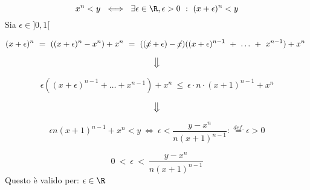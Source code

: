 \documentclass[../rip.tex]{subfiles}
\begin{document}
\begin{dimo}[$x^n < y$]

	\begin{equation}
	x^n < y \ \iff\ \exists\epsilon \in \R, 
	\epsilon > 0 \ :\ (x + \epsilon)^n < y
	\end{equation}
Sia $\epsilon \in ]0,1[$

	\begin{equation}
	(x + \epsilon)^n\ =\ ((x + \epsilon)^n - x^n) + x^n\ =\
	((\cancel{x} + \epsilon)- \cancel{x})((x+ \epsilon)^{n-1}\ +\	
	\dots\ +\ x^{n-1}) + x^n\
	\end{equation}
	
	\begin{equation}
	\big\Downarrow
	\end{equation}

	\begin{equation}
	\epsilon ( (x + \epsilon)^{n-1} + \dots + x^{n-1}) + x^n\ \leq\
	\epsilon \cdot n \cdot (x + 1)^{n-1} + x^n
	\end{equation}

	\begin{equation}
	\big\Downarrow
	\end{equation}
	
	\begin{equation}
	\epsilon n (x+1)^{n-1} + x^n < y \ \iff\ 
	\epsilon < \frac{y - x^n}{n(x+1)^{n-1}} : \overset{def.}{=} \epsilon > 0
	\end{equation}

	\begin{equation}
	0\ <\ \epsilon\ <\ \frac{y - x^n}{n(x+1)^{n-1}} 	
	\end{equation}
Questo è valido per: $ \epsilon \in \R $ 

		
\end{dimo}
\end{document}

